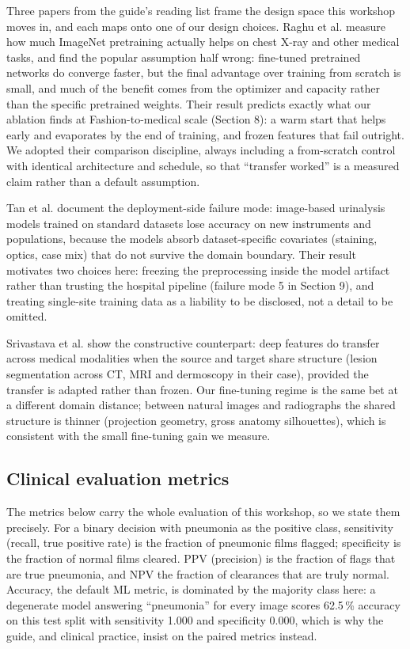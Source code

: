 \documentclass[11pt,a4paper]{article}
\begin{document}
Three papers from the guide's reading list frame the design space this workshop moves in, and each maps onto one of our design choices. Raghu et al. measure how much ImageNet pretraining actually helps on chest X-ray and other medical tasks, and find the popular assumption half wrong: fine-tuned pretrained networks do converge faster, but the final advantage over training from scratch is small, and much of the benefit comes from the optimizer and capacity rather than the specific pretrained weights. Their result predicts exactly what our ablation finds at Fashion-to-medical scale (Section 8): a warm start that helps early and evaporates by the end of training, and frozen features that fail outright. We adopted their comparison discipline, always including a from-scratch control with identical architecture and schedule, so that ``transfer worked'' is a measured claim rather than a default assumption.

Tan et al. document the deployment-side failure mode: image-based urinalysis models trained on standard datasets lose accuracy on new instruments and populations, because the models absorb dataset-specific covariates (staining, optics, case mix) that do not survive the domain boundary. Their result motivates two choices here: freezing the preprocessing inside the model artifact rather than trusting the hospital pipeline (failure mode 5 in Section 9), and treating single-site training data as a liability to be disclosed, not a detail to be omitted.

Srivastava et al. show the constructive counterpart: deep features do transfer across medical modalities when the source and target share structure (lesion segmentation across CT, MRI and dermoscopy in their case), provided the transfer is adapted rather than frozen. Our fine-tuning regime is the same bet at a different domain distance; between natural images and radiographs the shared structure is thinner (projection geometry, gross anatomy silhouettes), which is consistent with the small fine-tuning gain we measure.

\subsection{Clinical evaluation metrics}

The metrics below carry the whole evaluation of this workshop, so we state them precisely. For a binary decision with pneumonia as the positive class, sensitivity (recall, true positive rate) is the fraction of pneumonic films flagged; specificity is the fraction of normal films cleared. PPV (precision) is the fraction of flags that are true pneumonia, and NPV the fraction of clearances that are truly normal. Accuracy, the default ML metric, is dominated by the majority class here: a degenerate model answering ``pneumonia'' for every image scores 62.5\,\% accuracy on this test split with sensitivity 1.000 and specificity 0.000, which is why the guide, and clinical practice, insist on the paired metrics instead.
\end{document}
